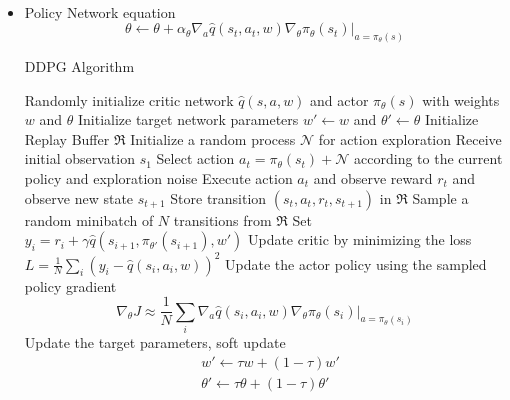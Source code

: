 \documentclass[a4paper]{article}
\begin{document}
\begin{itemize}
\begin{equation*}
\begin{split}
        \end{split}
    \end{equation*}
    \item Policy Network equation
    \begin{equation*}
        \theta \gets \theta + \alpha_\theta \nabla_a\hat{q}(s_t,a_t,w)\nabla_\theta \pi_\theta(s_t)|_{a=\pi_\theta(s)}
    \end{equation*}
    \begin{algorithm}[H]
        \caption{DDPG Algorithm}
        \begin{algorithmic}[1]
            \State Randomly initialize critic network $\hat{q}(s,a,w)$ and actor $\pi_\theta(s)$ with weights $w$ and $\theta$
            \State Initialize target network parameters $w'\gets w$ and $\theta'\gets \theta$
            \State Initialize Replay Buffer $\Re$
                \State Initialize a random process $\mathcal{N}$ for action exploration
                \State Receive initial observation $s_1$
                    \State Select action $a_t=\pi_\theta(s_t)+\mathcal{N}$ according to the current policy and exploration noise
                    \State Execute action $a_t$ and observe reward $r_t$ and observe new state $s_{t+1}$
                    \State Store transition $(s_t,a_t,r_t,s_{t+1})$ in $\Re$
                    \State Sample a random minibatch of $N$ transitions from $\Re$
                    \State Set $y_i=r_i+\gamma \hat{q}(s_{i+1},\pi_{\theta'}(s_{i+1}),w')$
                    \State Update critic by minimizing the loss $L=\frac{1}{N}\sum_i(y_i-\hat{q}(s_i,a_i,w))^2$
                    \State Update the actor policy using the sampled policy gradient
                    \begin{equation*}
                        \nabla_\theta J\approx \frac{1}{N}\sum_i\nabla_a\hat{q}(s_i,a_i,w)\nabla_\theta \pi_\theta(s_i)|_{a=\pi_\theta(s_i)}
                    \end{equation*}
                    \State Update the target parameters, soft update
                    \begin{equation*}
                        \begin{split}
                            &w'\gets \tau w+(1-\tau)w'\\
                            &\theta'\gets \tau \theta+(1-\tau)\theta'
                        \end{split}
                    \end{equation*}
                \EndFor
            \EndFor
        \end{algorithmic}
    \end{algorithm}
\end{itemize}
\end{document}
